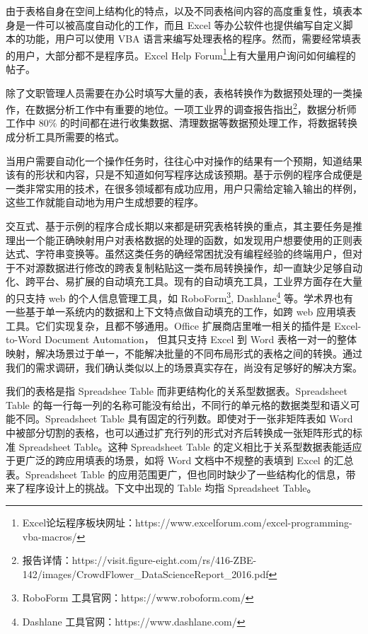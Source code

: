 \documentclass[design, pageheader]{njubachelor}
\begin{document}
由于表格自身在空间上结构化的特点，以及不同表格间内容的高度重复性，填表本身是一件可以被高度自动化的工作，而且 Excel 等办公软件也提供编写自定义脚本的功能，用户可以使用 VBA 语言来编写处理表格的程序。然而，需要经常填表的用户，大部分都不是程序员。Excel Help Forum\footnote{Excel论坛程序板块网址：https://www.excelforum.com/excel-programming-vba-macros/}上有大量用户询问如何编程的帖子。

除了文职管理人员需要在办公时填写大量的表，表格转换作为数据预处理的一类操作，在数据分析工作中有重要的地位\cite{kandel11.2}。一项工业界的调查报告指出\footnote{报告详情：https://visit.figure-eight.com/rs/416-ZBE-142/images/CrowdFlower\_DataScienceReport\_2016.pdf}，数据分析师工作中 80\% 的时间都在进行收集数据、清理数据等数据预处理工作，将数据转换成分析工具所需要的格式。

当用户需要自动化一个操作任务时，往往心中对操作的结果有一个预期，知道结果该有的形状和内容，只是不知道如何写程序达成该预期。基于示例的程序合成便是一类非常实用的技术，在很多领域都有成功应用\cite{feser15}\cite{smith16}\cite{rolim17}，用户只需给定输入输出的样例，这些工作就能自动地为用户生成想要的程序。

交互式、基于示例的程序合成长期以来都是研究表格转换的重点\cite{gulwani15}，其主要任务是推理出一个能正确映射用户对表格数据的处理的函数，如发现用户想要使用的正则表达式\cite{raza17}、字符串变换\cite{gulwani11}等。虽然这类任务的确经常困扰没有编程经验的终端用户，但对于不对源数据进行修改的跨表复制粘贴这一类布局转换操作，却一直缺少足够自动化、跨平台、易扩展的自动填充工具。现有的自动填充工具，工业界方面存在大量的只支持 web 的个人信息管理工具，如 RoboForm\footnote{RoboForm 工具官网：https://www.roboform.com/}, Dashlane\footnote{Dashlane 工具官网：https://www.dashlane.com/} 等。学术界也有一些基于单一系统内的数据和上下文特点做自动填充的工作，如跨 web 应用填表工具\cite{wang13}。它们实现复杂，且都不够通用。Office 扩展商店里唯一相关的插件是 Excel-to-Word Document Automation， 但其只支持 Excel 到 Word 表格一对一的整体映射，解决场景过于单一，不能解决批量的不同布局形式的表格之间的转换。通过我们的需求调研，我们确认类似以上的场景真实存在，尚没有足够好的解决方案。

我们的表格是指 Spreadshee Table 而非更结构化的关系型数据表。Spreadsheet Table 的每一行每一列的名称可能没有给出，不同行的单元格的数据类型和语义可能不同。Spreadsheet Table 具有固定的行列数。即使对于一张非矩阵表如 Word 中被部分切割的表格，也可以通过扩充行列的形式对齐后转换成一张矩阵形式的标准 Spreadsheet Table。这种 Spreadsheet Table 的定义相比于关系型数据表能适应于更广泛的跨应用填表的场景，如将 Word 文档中不规整的表填到 Excel 的汇总表。Spreadsheet Table 的应用范围更广，但也同时缺少了一些结构化的信息，带来了程序设计上的挑战。下文中出现的 Table 均指 Spreadsheet Table。
\end{document}
